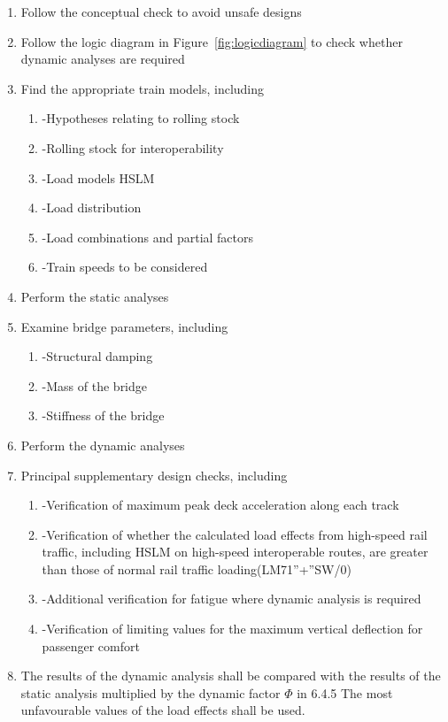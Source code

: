 \begin{enumerate}
	\item  Follow the conceptual check to avoid unsafe designs
	\item  Follow the logic diagram in Figure~\ref{fig:logicdiagram} to check whether dynamic analyses are required 
	\item  Find the appropriate train models, including 
	\begin{enumerate}
		\item-Hypotheses relating to rolling stock
		\item-Rolling stock for interoperability
		\item-Load models HSLM
		\item-Load distribution
		\item-Load combinations and partial factors
		\item-Train speeds to be considered
	\end{enumerate}
	\item Perform the static analyses
	\item  Examine bridge parameters, including
		\begin{enumerate}
			\item-Structural damping
			\item-Mass of the bridge
			\item-Stiffness of the bridge
		\end{enumerate}
	\item Perform the dynamic analyses
	\item  Principal supplementary design checks, including
	\begin{enumerate}
		\item-Verification of maximum peak deck acceleration along each track
		\item-Verification of whether the calculated load effects from high-speed rail traffic, including HSLM on high-speed interoperable routes, are greater than those of normal rail traffic loading(LM71''+''SW/0)
		\item-Additional verification for fatigue where dynamic analysis is required
		\item-Verification of limiting values for the maximum vertical deflection for passenger comfort
	\end{enumerate}
	\item The results of the dynamic analysis shall be compared with the results of the static
analysis multiplied by the dynamic factor $\varPhi$ in 6.4.5 The most unfavourable values of the load effects shall be used. 
\end{enumerate}

